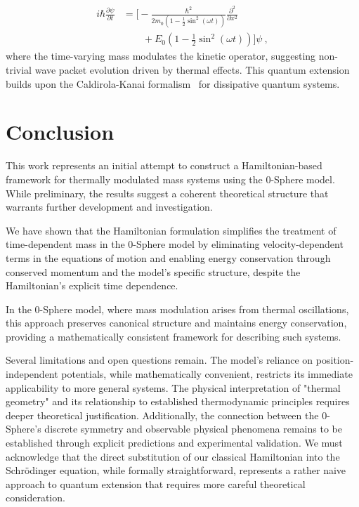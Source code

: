\documentclass[%
 reprint,
 amsmath,amssymb,
 aps,
]{revtex4-1}
\numberwithin{equation}{section}%
\begin{document}
\begin{equation}
\begin{split}
i \hbar \frac{\partial \psi}{\partial t}
    &= \Bigg[ - \frac{\hbar^2}{2 m_0 \left( 1 - \frac{1}{2} \sin^2 (\omega t) \right)} \frac{\partial^2}{\partial x^2} \\
    &\quad \quad + E_0 \left( 1 - \frac{1}{2} \sin^2 (\omega t) \right) \Bigg] \psi
    \ ,
\end{split}
\end{equation}
where the time-varying mass modulates the kinetic operator, suggesting non-trivial wave packet evolution driven by thermal effects. This quantum extension builds upon the Caldirola-Kanai formalism~\cite{caldirola1941,kanai1948} for dissipative quantum systems.


\section{Conclusion}

This work represents an initial attempt to construct a Hamiltonian-based framework for thermally modulated mass systems using the 0-Sphere model. While preliminary, the results suggest a coherent theoretical structure that warrants further development and investigation.

We have shown that the Hamiltonian formulation simplifies the treatment of time-dependent mass in the 0-Sphere model by eliminating velocity-dependent terms in the equations of motion and enabling energy conservation through conserved momentum and the model’s specific structure, despite the Hamiltonian’s explicit time dependence.

In the 0-Sphere model, where mass modulation arises from thermal oscillations, this approach preserves canonical structure and maintains energy conservation, providing a mathematically consistent framework for describing such systems.

Several limitations and open questions remain. The model's reliance on position-independent potentials, while mathematically convenient, restricts its immediate applicability to more general systems. The physical interpretation of "thermal geometry" and its relationship to established thermodynamic principles requires deeper theoretical justification. Additionally, the connection between the 0-Sphere's discrete symmetry and observable physical phenomena remains to be established through explicit predictions and experimental validation. We must acknowledge that the direct substitution of our classical Hamiltonian into the Schrödinger equation, while formally straightforward, represents a rather naive approach to quantum extension that requires more careful theoretical consideration.
\end{document}
